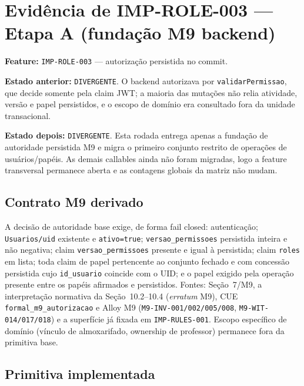 \section{Evidência de IMP-ROLE-003 --- Etapa A (fundação M9 backend)}

\textbf{Feature:} \texttt{IMP-ROLE-003} --- autorização persistida no commit.

\textbf{Estado anterior:} \texttt{DIVERGENTE}. O backend autorizava por
\texttt{validarPermissao}, que decide somente pela claim JWT; a maioria das
mutações não relia atividade, versão e papel persistidos, e o escopo de domínio
era consultado fora da unidade transacional.

\textbf{Estado depois:} \texttt{DIVERGENTE}. Esta rodada entrega apenas a
fundação de autoridade persistida M9 e migra o primeiro conjunto restrito de
operações de usuários/papéis. As demais callables ainda não foram migradas, logo
a feature transversal permanece aberta e as contagens globais da matriz não
mudam.

\subsection{Contrato M9 derivado}

A decisão de autoridade base exige, de forma fail closed: autenticação;
\texttt{Usuarios/uid} existente e \texttt{ativo=true}; \texttt{versao\_permissoes}
persistida inteira e não negativa; claim \texttt{versao\_permissoes} presente e
igual à persistida; claim \texttt{roles} em lista; toda claim de papel
pertencente ao conjunto fechado e com concessão persistida cujo
\texttt{id\_usuario} coincide com o UID; e o papel exigido pela operação presente
entre os papéis afirmados e persistidos. Fontes: Seção~7/M9, a interpretação
normativa da Seção~10.2--10.4 (\textit{erratum} M9), CUE
\texttt{formal\_m9\_autorizacao} e Alloy M9
(\texttt{M9-INV-001/002/005/008}, \texttt{M9-WIT-014/017/018}) e a superfície já
fixada em \texttt{IMP-RULES-001}. Escopo específico de domínio (vínculo de
almoxarifado, ownership de professor) permanece fora da primitiva base.

\subsection{Primitiva implementada}

\begin{center}\small
{}
\end{center}

